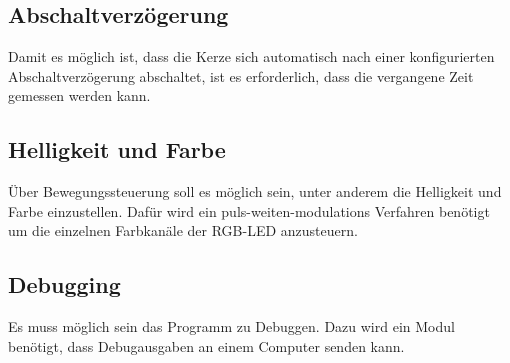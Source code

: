     \subsection{Abschaltverzögerung}
        Damit es möglich ist, dass die Kerze sich automatisch nach einer
        konfigurierten Abschaltverzögerung abschaltet, ist es erforderlich,
        dass die vergangene Zeit gemessen werden kann.

    \subsection{Helligkeit und Farbe}
        Über Bewegungssteuerung soll es möglich sein, unter anderem die
        Helligkeit und Farbe einzustellen.
        Dafür wird ein puls-weiten-modulations Verfahren benötigt um die
        einzelnen Farbkanäle der RGB-LED anzusteuern.

    \subsection{Debugging}
        Es muss möglich sein das Programm zu Debuggen. Dazu wird ein Modul
        benötigt, dass Debugausgaben an einem Computer senden kann.

        




